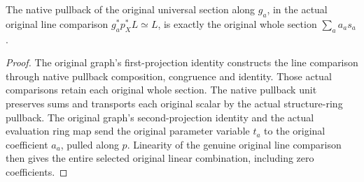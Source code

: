 \begin{lemma}
\label{lem:kn-nadel-bertini-selected-section}
\leanok
{}
The native pullback of the original universal section along $g_a$, in the
actual original line comparison $g_a^*p_X^*L\simeq L$, is exactly the
original whole section $\sum_a a_a s_a$.
\end{lemma}
\begin{proof}
The original graph's first-projection identity constructs the line
comparison through native pullback composition, congruence and identity.
Those actual comparisons retain each original whole section. The native
pullback unit preserves sums and transports each original scalar by the
actual structure-ring pullback. The original graph's second-projection
identity and the actual evaluation ring map send the original parameter
variable $t_a$ to the original coefficient $a_a$, pulled along $p$.
Linearity of the genuine original line comparison then gives the entire
selected original linear combination, including zero coefficients.
\end{proof}

